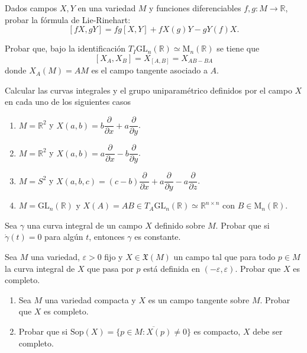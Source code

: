 \documentclass[12pt, a4paper]{amsart}
\theoremstyle{definition}
\newcommand{\RR}{\mathbb{R}}      %
\newcommand{\eps}{\varepsilon}
\begin{document}
\begin{question}
Dados campos $X,Y$ en una variedad $M$ y funciones diferenciables $f,g:M\to\RR$, probar la fórmula de Lie-Rinehart: $$[fX,gY]=fg[X,Y]+f X(g)Y  - gY(f)X.$$
\end{question}

\begin{question}
Probar que, bajo la identificación $T_I\mathrm{GL}_n(\RR)\simeq \mathrm{M}_n(\RR)$ se tiene que $$[X_A,X_B]=X_{[A,B]} = X_{AB-BA}$$ donde $X_A(M)=AM$ es el campo tangente asociado a $A$.
\end{question}

\begin{question}
Calcular las curvas integrales y el grupo uniparamétrico definidos por el campo $X$ en cada uno de los siguientes casos
\begin{enumerate}[label=\textbf{\alph*.}]
\item $M=\RR^2$ y $X(a,b)=b\dfrac{\partial}{\partial x} + a\dfrac{\partial}{\partial y}$.
\item $M=\RR^2$ y $X(a,b)=a\dfrac{\partial}{\partial x} - b\dfrac{\partial}{\partial y}$.
\item $M=S^2$ y $X(a,b,c) = (c-b)\dfrac{\partial}{\partial x} + a\dfrac{\partial}{\partial y} - a\dfrac{\partial}{\partial z}$.
\item $M=\mathrm{GL}_n(\RR)$ y $X(A)=AB\in T_A\mathrm{GL}_n(\RR)\simeq\RR^{n\times n}$ con $B\in\mathrm{M}_n(\RR)$.
\end{enumerate}
\end{question}

\begin{question}
Sea $\gamma$ una curva integral de un campo $X$ definido sobre $M$. Probar que si $\dot{\gamma}(t)=0$ para algún $t$, entonces $\gamma$ es constante.
\end{question}

\begin{question}
Sea $M$ una variedad, $\eps>0$ fijo y $X\in\mathfrak{X}(M)$ un campo tal que para todo $p\in M$ la curva integral de $X$ que pasa por $p$ está definida en $(-\eps,\eps)$. Probar que $X$ es completo.
\end{question}

\begin{question}\vspace{-1.5em}
\begin{enumerate}[label=\textbf{\alph*.}]
\item Sea $M$ una variedad compacta y $X$ es un campo tangente sobre $M$. Probar que $X$ es completo.
\item Probar que si $\mathrm{Sop}(X)=\overline{\{p\in M : X(p)\neq 0\}}$ es compacto, $X$ debe ser completo.
\end{enumerate}
\end{question}
\end{document}

